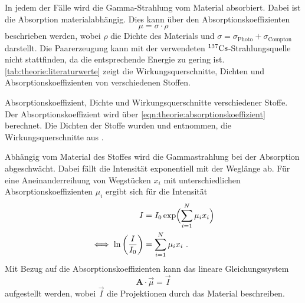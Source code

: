     In jedem der Fälle wird die Gamma-Strahlung vom Material absorbiert.
    Dabei ist die Absorption materialabhängig.
    Dies kann über den Absorptionskoeffizienten
    \begin{equation}
        \mu = \sigma \cdot \rho
        \label{eqn:theorie:absorptionskoeffizient}
    \end{equation}
    beschrieben werden,
    wobei $\rho$ die Dichte des Materials und $\sigma = \sigma_\text{Photo} + \sigma_\text{Compton}$ darstellt.
    Die Paarerzeugung kann mit der verwendeten $^{137}\ce{Cs}$-Strahlungsquelle nicht stattfinden,
    da die entsprechende Energie zu gering ist.
    \autoref{tab:theorie:literaturwerte} zeigt die Wirkungsquerschnitte,
    Dichten und Absorptionskoeffizienten von verschiedenen Stoffen.
    \begin{table}[H]
        \centering
        \caption{Absorptionskoeffizient, Dichte und Wirkungsquerschnitte verschiedener Stoffe.
        Der Absorptionskoeffizient wird über \autoref{eqn:theorie:absorptionskoeffizient} berechnet.
        Die Dichten der Stoffe wurden \cite{dichten} und \cite{TODO} entnommen,
        die Wirkungsquerschnitte aus \cite{crosssections}.}
        \label{tab:theorie:literaturwerte}
    \end{table}
    Abhängig vom Material des Stoffes wird die Gammastrahlung bei der Absorption abgeschwächt.
    Dabei fällt die Intensität exponentiell mit der Weglänge ab.
    Für eine Aneinanderreihung von Wegstücken $x_i$
    mit unterschiedlichen Absorptionskoeffizienten $\mu_i$
    ergibt sich für die Intensität
    \begin{align}
        I &= I_0 \exp\Bigl(\sum_{i=1}^N \mu_i x_i \Bigr) \\
        \iff \ln\left(\frac{I}{I_0}\right) &= \sum_{i=1}^N \mu_i x_i \ .
        \label{eqn:theorie:intensitaet2}
    \end{align}
    Mit Bezug auf die Absorptionskoeffizienten kann das lineare Gleichungssystem
    \begin{equation}
        \symbf{A} \cdot \vec{\mu} = \vec{I}
    \end{equation}
    aufgestellt werden,
    wobei $\vec{I}$ die Projektionen durch das Material beschreiben.
